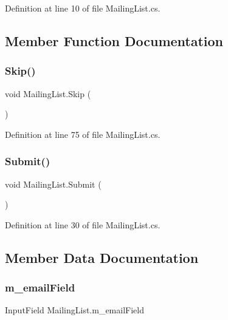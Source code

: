 Definition at line 10 of file Mailing\+List.\+cs.



\subsection{Member Function Documentation}
\mbox{\label{class_mailing_list_a6f0bbe61dbb5c876e14b79be640fde98}} 
\subsubsection{\texorpdfstring{Skip()}{Skip()}}
{\footnotesize\ttfamily void Mailing\+List.\+Skip (\begin{DoxyParamCaption}{ }\end{DoxyParamCaption})}



Definition at line 75 of file Mailing\+List.\+cs.

\mbox{\label{class_mailing_list_af6124855f8ef9b921fab7289c2ebd6cb}} 
\subsubsection{\texorpdfstring{Submit()}{Submit()}}
{\footnotesize\ttfamily void Mailing\+List.\+Submit (\begin{DoxyParamCaption}{ }\end{DoxyParamCaption})}



Definition at line 30 of file Mailing\+List.\+cs.



\subsection{Member Data Documentation}
\mbox{\label{class_mailing_list_a361acc737c53d308383e9d9c658875ee}} 
\subsubsection{\texorpdfstring{m\+\_\+email\+Field}{m\_emailField}}
{\footnotesize\ttfamily Input\+Field Mailing\+List.\+m\+\_\+email\+Field}



